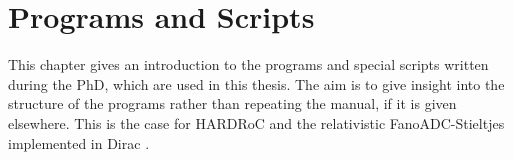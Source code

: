 \chapter{Programs and Scripts}
\label{app:programs}

This chapter gives an introduction to the programs and special scripts
written during the PhD, which are used in this thesis. The aim is
to give insight into the structure of the programs rather than repeating
the manual, if it is given elsewhere. This is the case for HARDRoC
\cite{HARDRoC} and the relativistic FanoADC-Stieltjes implemented in Dirac
\cite{DIRAC13}.





